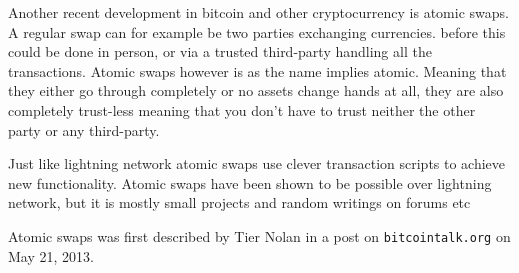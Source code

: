
Another recent development in bitcoin and other cryptocurrency is atomic swaps. A regular swap can for example be two parties exchanging currencies. before this could be done in person, or via a trusted third-party handling all the transactions. Atomic swaps however is as the name implies atomic. Meaning that they either go through completely or no assets change hands at all, they are also completely trust-less meaning that you don't have to trust neither the other party or any third-party.

Just like lightning network atomic swaps use clever transaction scripts to achieve new functionality. Atomic swaps have been shown to be possible over lightning network, but it is mostly small projects and random writings on forums etc

Atomic swaps was first described by Tier Nolan in a post on \texttt{bitcointalk.org} on May 21, 2013.\cite{tier_nolan}